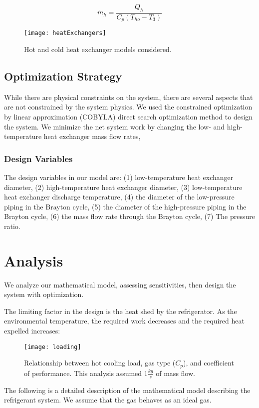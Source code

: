 \documentclass{article}
\begin{document}
\begin{equation}
    \dot{m}_{h} = \frac{Q_h}{C_p(T_{ho}-T_{3})}
\end{equation}

\begin{figure}[htb!]
    \centering
     \texttt{[image: heatExchangers]}
     \caption{\label{fig:HE} Hot and cold heat exchanger models considered.}
\end{figure}

\subsection{Optimization Strategy}
While there are physical constraints on the system, there are several aspects that are not constrained by the system physics. We used the constrained optimization by linear approximation (COBYLA) direct search optimization method to design the system. We minimize the net system work by changing the low- and high-temperature heat exchanger mass flow rates, 

\subsubsection{Design Variables}
The design variables in our model are: (1) low-temperature heat exchanger diameter, (2) high-temperature heat exchanger diameter, (3) low-temperature heat exchanger discharge temperature, (4) the diameter of the low-pressure piping in the Brayton cycle, (5) the diameter of the high-pressure piping in the Brayton cycle, (6) the mass flow rate through the Brayton cycle, (7) The pressure ratio.

\section{Analysis}
We analyze our mathematical model, assessing sensitivities, then design the system with optimization.


The limiting factor in the design is the heat shed by the refrigerator. As the environmental temperature, the required work decreases and the required heat expelled increases:

\begin{figure}
    \centering
     \texttt{[image: loading]}
     \caption{\label{fig:deps} Relationship between hot cooling load, gas type ($C_p$), and coefficient of performance. This analysis assumed 1$\frac{kg}{s}$ of mass flow.}
\end{figure}
\appendix
{}
The following is a detailed description of the mathematical model describing the refrigerant system. We assume that the gas behaves as an ideal gas. 
\end{document}
